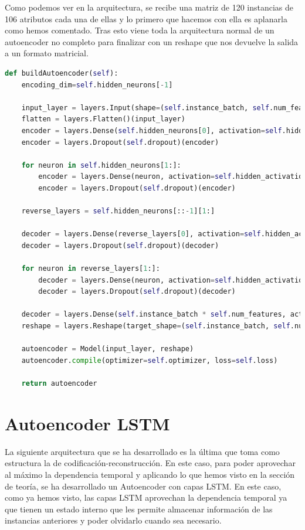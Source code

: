 Como podemos ver en la arquitectura, se recibe una matriz de 120 instancias de 106 atributos cada una de ellas y lo primero que hacemos con ella es aplanarla como hemos comentado. Tras esto viene toda la arquitectura normal de un autoencoder no completo para finalizar con un reshape que nos devuelve la salida a un formato matricial.

\begin{lstlisting}[language=Python]
def buildAutoencoder(self):
	encoding_dim=self.hidden_neurons[-1]
	
	input_layer = layers.Input(shape=(self.instance_batch, self.num_features))
	flatten = layers.Flatten()(input_layer)
	encoder = layers.Dense(self.hidden_neurons[0], activation=self.hidden_activation, activity_regularizer = l2(self.l2_regularizer))(flatten)
	encoder = layers.Dropout(self.dropout)(encoder)
	
	for neuron in self.hidden_neurons[1:]:
		encoder = layers.Dense(neuron, activation=self.hidden_activation, activity_regularizer = l2(self.l2_regularizer))(encoder)
		encoder = layers.Dropout(self.dropout)(encoder)
	
	reverse_layers = self.hidden_neurons[::-1][1:]
	
	decoder = layers.Dense(reverse_layers[0], activation=self.hidden_activation, activity_regularizer = l2(self.l2_regularizer))(encoder)
	decoder = layers.Dropout(self.dropout)(decoder)
	
	for neuron in reverse_layers[1:]:
		decoder = layers.Dense(neuron, activation=self.hidden_activation, activity_regularizer = l2(self.l2_regularizer))(decoder)
		decoder = layers.Dropout(self.dropout)(decoder)
	
	decoder = layers.Dense(self.instance_batch * self.num_features, activation=self.output_activation, activity_regularizer = l2(self.l2_regularizer))(decoder)
	reshape = layers.Reshape(target_shape=(self.instance_batch, self.num_features))(decoder)
	
	autoencoder = Model(input_layer, reshape)
	autoencoder.compile(optimizer=self.optimizer, loss=self.loss)
	
	return autoencoder
\end{lstlisting}

\section{Autoencoder LSTM}

La siguiente arquitectura que se ha desarrollado es la última que toma como estructura la de codificación-reconstrucción. En este caso, para poder aprovechar al máximo la dependencia temporal y aplicando lo que hemos visto en la sección de teoría, se ha desarrollado un Autoencoder con capas LSTM. En este caso, como ya hemos visto, las capas LSTM aprovechan la dependencia temporal ya que tienen un estado interno que les permite almacenar información de las instancias anteriores y poder olvidarlo cuando sea necesario.

